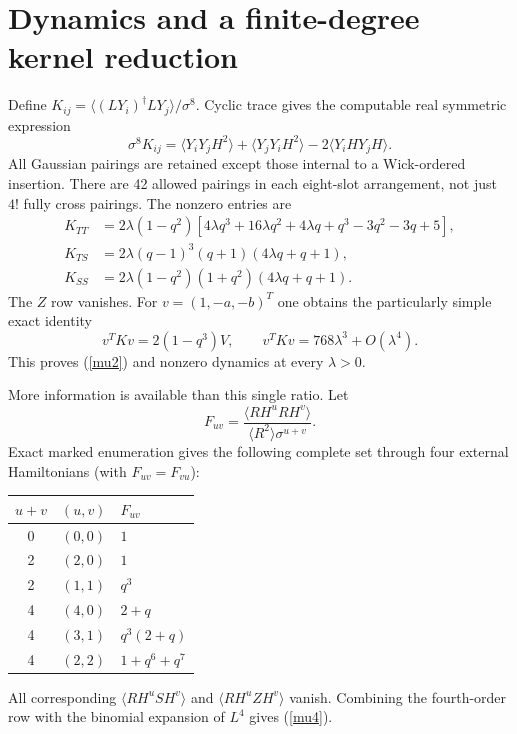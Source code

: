 \documentclass[11pt,a4paper]{article}
\newcommand{\av}[1]{\langle #1\rangle}
\begin{document}
\newpage
\section{Dynamics and a finite-degree kernel reduction}
Define $K_{ij}=\av{(LY_i)^\dagger LY_j}/\sigma^8$.
Cyclic trace gives the computable real symmetric expression
\begin{equation}
 \sigma^8K_{ij}
 =\av{Y_iY_jH^2}+\av{Y_jY_iH^2}-2\av{Y_iHY_jH}.
\end{equation}
All Gaussian pairings are retained except those internal to a
Wick-ordered insertion. There are 42 allowed pairings in each
eight-slot arrangement, not just $4!$ fully cross pairings.
The nonzero entries are
\begin{align}
 K_{TT}&=2\lambda(1-q^2)
 [4\lambda q^3+16\lambda q^2+4\lambda q+q^3-3q^2-3q+5],\\
 K_{TS}&=2\lambda(q-1)^3(q+1)(4\lambda q+q+1),\\
 K_{SS}&=2\lambda(1-q^2)(1+q^2)(4\lambda q+q+1).
\end{align}
The $Z$ row vanishes. For $v=(1,-a,-b)^T$ one obtains the
particularly simple exact identity
\begin{equation}
 v^TKv=2(1-q^3)V,\qquad
 v^TKv=768\lambda^3+O(\lambda^4).                      \label{ratio}
\end{equation}
This proves (\ref{mu2}) and nonzero dynamics at every $\lambda>0$.

More information is available than this single ratio. Let
\[
 F_{uv}=\frac{\av{RH^uRH^v}}{\av{R^2}\sigma^{u+v}} .
\]
Exact marked enumeration gives the following complete set through
four external Hamiltonians (with $F_{uv}=F_{vu}$):
\begin{center}
\begin{tabular}{ccl}
\toprule
$u+v$ & $(u,v)$ & $F_{uv}$\\
\midrule
0 & $(0,0)$ & $1$\\
2 & $(2,0)$ & $1$\\
2 & $(1,1)$ & $q^3$\\
4 & $(4,0)$ & $2+q$\\
4 & $(3,1)$ & $q^3(2+q)$\\
4 & $(2,2)$ & $1+q^6+q^7$\\
\bottomrule
\end{tabular}
\end{center}
All corresponding $\av{RH^uSH^v}$ and
$\av{RH^uZH^v}$ vanish. Combining the fourth-order row with
the binomial expansion of $L^4$ gives (\ref{mu4}).
\end{document}
